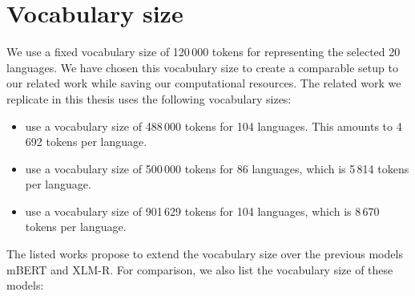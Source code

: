 



\section{Vocabulary size}
\label{sec:vocabulary_size}


We use a fixed vocabulary size of 120\,000 tokens for representing the selected 20 languages. We have chosen this vocabulary size to create a comparable setup to our related work while saving our computational resources. The related work we replicate in this thesis uses the following vocabulary sizes:

\begin{itemize}
    \item \citet{chung_improving_2020} use a vocabulary size of 488\,000 tokens for 104 languages. This amounts to 4\,692 tokens per language.
    \item \citet{zheng_allocating_2021} use a vocabulary size of 500\,000 tokens for 86 languages, which is 5\,814 tokens per language.
    \item \citet{liang_xlm-v_2023} use a vocabulary size of 901\,629 tokens for 104 languages, which is 8\,670 tokens per language.
\end{itemize}

The listed works propose to extend the vocabulary size over the previous models mBERT and XLM-R. For comparison, we also list the vocabulary size of these models:

